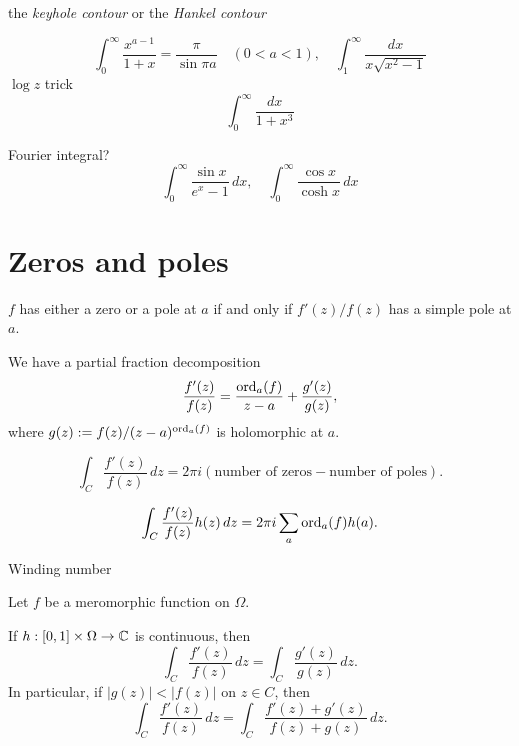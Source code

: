 \documentclass{../../large}
\begin{document}
\begin{prb}
the \emph{keyhole contour} or the \emph{Hankel contour}

\[\int_0^\infty\frac{x^{a-1}}{1+x}=\frac\pi{\sin\pi a}\quad(0<a<1),\quad\int_1^\infty\frac{dx}{x\sqrt{x^2-1}}\]
$\log z$ trick
\[\int_0^\infty\frac{dx}{1+x^3}\]
\end{prb}

\begin{prb}
Fourier integral?
\[\int_0^\infty\frac{\sin x}{e^x-1}\,dx,\quad\int_0^\infty\frac{\cos x}{\cosh x}\,dx\]
\end{prb}







\section{Zeros and poles}
\begin{prb}
\begin{parts}
\item $f$ has either a zero or a pole at $a$ if and only if $f'(z)/f(z)$ has a simple pole at $a$. 
\item We have a partial fraction decomposition
\[\frac{f'(z)}{f(z)}=\frac{\operatorname{ord}_a(f)}{z-a}+\frac{g'(z)}{g(z)},\]
where $g(z):=f(z)/(z-a)^{\operatorname{ord}_a(f)}$ is holomorphic at $a$.
\item
\[\int_C\frac{f'(z)}{f(z)}\,dz=2\pi i(\text{number of zeros}-\text{number of poles}).\]
\item
\[\int_C\frac{f'(z)}{f(z)}h(z)\,dz=2\pi i\sum_a\operatorname{ord}_a(f)h(a).\]
\item Winding number
\end{parts}
\end{prb}


\begin{prb}
Let $f$ be a meromorphic function on $\Omega$.
\begin{parts}
\item
If $h:[0,1]\times\Omega\to\mathbb{C}$ is continuous, then 
\[\int_C\frac{f'(z)}{f(z)}\,dz=\int_C\frac{g'(z)}{g(z)}\,dz.\]
In particular, if $|g(z)|<|f(z)|$ on $z\in C$, then
\[\int_C\frac{f'(z)}{f(z)}\,dz=\int_C\frac{f'(z)+g'(z)}{f(z)+g(z)}\,dz.\]
\end{parts}
\end{prb}
\end{document}
